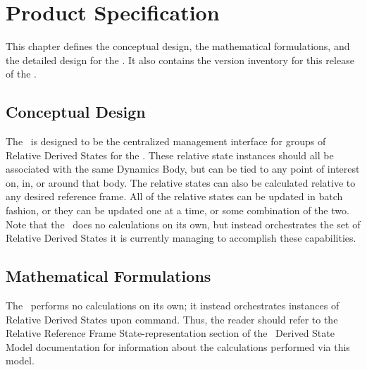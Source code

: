 %
%
%
%
%



\chapter{Product Specification}\label{ch:spec}

This chapter defines the conceptual design, the mathematical formulations, and
the detailed design for the \relkinDesc.  It also contains the version inventory
for this release of the \relkinDesc.

\section{Conceptual Design}

The \relkinDesc\ is designed to be the centralized management interface for
groups of Relative Derived States for the \JEODid. These relative state
instances should all be associated with the same Dynamics Body, but can be
tied to any point of interest on, in, or around that body. The relative states
can also be calculated relative to any desired reference frame. All of the
relative states can be updated in batch fashion, or they can be updated one at
a time, or some combination of the two. Note that the \relkinDesc\ does no
calculations on its own, but instead orchestrates the set of Relative Derived
States it is currently managing to accomplish these capabilities.


\section{Mathematical Formulations}

The \relkinDesc\ performs no calculations on its own; it instead orchestrates
instances of Relative Derived States upon command. Thus, the reader should
refer to the Relative Reference Frame State-representation section of the
\JEODid\ Derived State Model documentation \cite{dynenv:DERIVEDSTATE} for
information about the calculations performed via this model.


